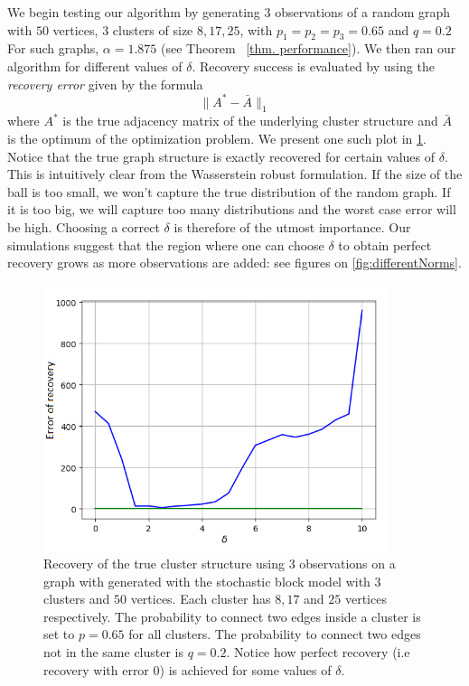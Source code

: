 \documentclass[12pt]{amsart}
\theoremstyle{remark}
\begin{document}
We begin testing our algorithm by generating $3$ observations of a random graph with $50$ vertices, $3$ clusters of size $8,17,25$, with $p_1=p_2=p_3=0.65$ and $q=0.2$ For such graphs, $\alpha = 1.875$ (see Theorem ~\ref{thm. performance}). We then ran our algorithm for different values of $\delta$. Recovery success is evaluated by using the \textit{recovery error} given by the formula
\[\|A^*-\bar{A}\|_1\]
where $A^*$ is the true adjacency matrix of the underlying cluster structure and $\bar{A}$ is the optimum of the optimization problem.
We present one such plot in \ref{fig:errorRecovery}. Notice that the true graph structure is exactly recovered for certain values of $\delta$.
This is intuitively clear from the Wasserstein robust formulation. If the size of the ball is too small, we won't capture the true distribution of the random graph. If it is too big, we will capture too many distributions and the worst case error will be high.
Choosing a correct $\delta$ is therefore of the utmost importance. Our simulations suggest that the region where one can choose $\delta$ to obtain perfect recovery grows as more observations are added: see figures on \ref{fig:differentNorms}.
\begin{figure}[H]
\centering
\includegraphics[width=0.9\textwidth]{./Pictures/ErrorRecoveryOK.PNG}
\caption{\small{Recovery of the true cluster structure using $3$ observations on a graph with generated with the stochastic block model with $3$ clusters and $50$ vertices. Each cluster has $8,17$ and $25$ vertices respectively. The probability to connect two edges inside a cluster is set to $p=0.65$ for all clusters. The probability to connect two edges not in the same cluster is $q=0.2$. Notice how perfect recovery (i.e recovery with error $0$) is achieved for some values of $\delta$. }}
 \label{fig:errorRecovery}
\end{figure}
\end{document}
